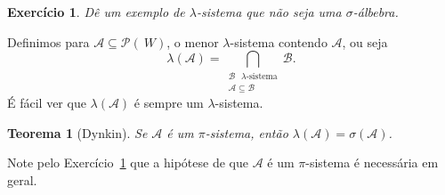 \documentclass[reqno, final]{book}
\newcommand*\1{\mathds{1}}
\newtheorem{theorem}{Teorema}[section]
\newtheorem{exercise}[example]{Exercício}
\begin{document}
\begin{exercise}
  \label{x:lambda_nao_sigma}
  Dê um exemplo de $\lambda$-sistema que não seja uma $\sigma$-álbebra.
\end{exercise}

Definimos para $\mathcal{A} \subseteq \mathcal{P}(~W)$, o menor $\lambda$-sistema contendo $\mathcal{A}$, ou seja
\begin{equation}
  \lambda(\mathcal{A}) = \bigcap_{\substack{\text{$\mathcal{B}$ $\lambda$-sistema}\\\mathcal{A} \subseteq \mathcal{B}}} \mathcal{B}.
\end{equation}
É fácil ver que $\lambda(\mathcal{A})$ é sempre um $\lambda$-sistema.

\begin{theorem}[Dynkin]
  \label{t:dynkin}
  Se $\mathcal{A}$ é um $\pi$-sistema, então $\lambda(\mathcal{A}) = \sigma(\mathcal{A})$.
\end{theorem}

Note pelo Exercício~\ref{x:lambda_nao_sigma} que a hipótese de que $\mathcal{A}$ é um $\pi$-sistema é necessária em geral.
\end{document}

